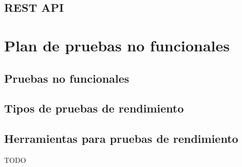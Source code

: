 \subsection{REST API}

\section{Plan de pruebas no funcionales}

\subsection{Pruebas no funcionales}

\subsection{Tipos de pruebas de rendimiento}

\subsection{Herramientas para pruebas de rendimiento}

TODO
